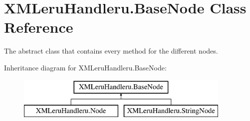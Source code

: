 \hypertarget{class_x_m_leru_handleru_1_1_base_node}{}\section{X\+M\+Leru\+Handleru.\+Base\+Node Class Reference}
\label{class_x_m_leru_handleru_1_1_base_node}


The abstract class that contains every method for the different nodes.  


Inheritance diagram for X\+M\+Leru\+Handleru.\+Base\+Node\+:\begin{figure}[H]
\begin{center}
\leavevmode
\includegraphics[height=2.000000cm]{class_x_m_leru_handleru_1_1_base_node}
\end{center}
\end{figure}
